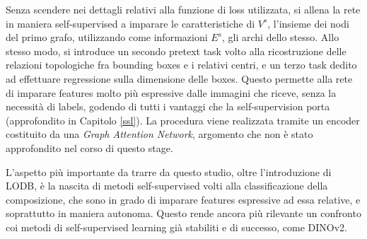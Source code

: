 Senza scendere nei dettagli relativi alla funzione di loss utilizzata, si allena la rete in maniera self-supervised a imparare le caratteristiche di \(V^s\), l'insieme dei nodi del primo grafo, utilizzando come informazioni \(E^s\), gli archi dello stesso. Allo stesso modo, si introduce un secondo pretext task volto alla ricostruzione delle relazioni topologiche fra bounding boxes e i relativi centri, e un terzo task dedito ad effettuare regressione sulla dimensione delle boxes. Questo permette alla rete di imparare features molto più espressive dalle immagini che riceve, senza la necessità di labels, godendo di tutti i vantaggi che la self-supervision porta (approfondito in Capitolo \ref{ssl}). La procedura viene realizzata tramite un encoder costituito da una \textit{Graph Attention Network}, argomento che non è stato approfondito nel corso di questo stage. 

L'aspetto più importante da trarre da questo studio, oltre l'introduzione di LODB, è la nascita di metodi self-supervised volti alla classificazione della composizione, che sono in grado di imparare features espressive ad essa relative, e soprattutto in maniera autonoma. Questo rende ancora più rilevante un confronto coi metodi di self-supervised learning già stabiliti e di successo, come DINOv2. 